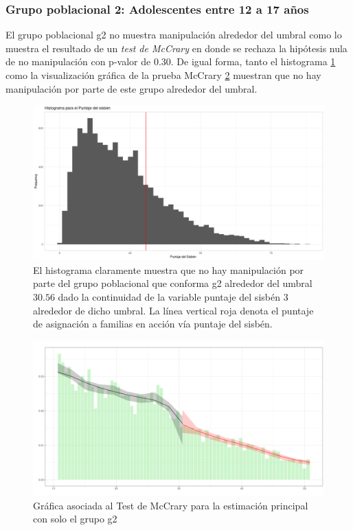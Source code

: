 \documentclass[AER]{AEA}
\begin{document}
\subsubsection{Grupo poblacional 2: Adolescentes entre 12 a 17 años}

El grupo poblacional g2 no muestra manipulación alrededor del umbral como lo muestra el resultado de un \textit{test de McCrary} en donde se rechaza la hipótesis nula de no manipulación con p-valor de $0.30$. De igual forma, tanto el histograma \ref{fig:hist_g2} como la visualización gráfica de la prueba McCrary \ref{fig:mccrary_g2} muestran que no hay manipulación por parte de este grupo alrededor del umbral. 

\begin{figure}[h!]
    \centering
    \includegraphics[scale = 0.35]{imagenes/estimaxs_adicionales/histograma_g2.png}
    \caption{El histograma claramente muestra que no hay manipulación por parte del grupo poblacional que conforma g2 alrededor del umbral $30.56$ dado la continuidad de la variable puntaje del sisbén 3 alrededor de dicho umbral. La línea vertical roja denota el puntaje de asignación a familias en acción vía puntaje del sisbén.}
    \label{fig:hist_g2}
\end{figure}

\begin{figure}[h!]
    \centering
    \includegraphics[scale = 0.35]{imagenes/estimaxs_adicionales/mccrary_g2.png}
    \caption{Gráfica asociada al Test de McCrary para la estimación principal con solo el grupo g2}
    \label{fig:mccrary_g2}
\end{figure}
\end{document}

